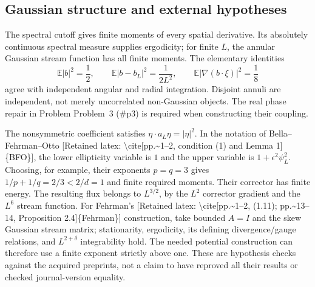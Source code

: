 \documentclass[10pt]{article}
\begin{document}
\subsection*{Gaussian structure and external hypotheses}
The spectral cutoff gives finite moments of every spatial derivative. Its absolutely continuous spectral measure supplies ergodicity; for finite \(L\), the annular Gaussian stream function has all finite moments. The elementary identities \[\mathbb E|b|^2=\frac12,\qquad
 \mathbb E|b-b_L|^2=\frac1{2L^2},\qquad
 \mathbb E|\nabla(b\cdot\xi)|^2=\frac18\] agree with independent angular and radial integration. Disjoint annuli are independent, not merely uncorrelated non-Gaussian objects. The real phase repair in Problem Problem 3 (\#p3) is required when constructing their coupling.\par
The nonsymmetric coefficient satisfies \(\eta\cdot a_L\eta=|\eta|^2\). In the notation of Bella–Fehrman–Otto [Retained latex: \textbackslash{}cite[pp.\textasciitilde{}1--2, condition (1) and Lemma 1]\{BFO\}], the lower ellipticity variable is \(1\) and the upper variable is \(1+\epsilon^2\psi_L^2\). Choosing, for example, their exponents \(p=q=3\) gives \(1/p+1/q=2/3<2/d=1\) and finite required moments. Their corrector has finite energy. The resulting flux belongs to \(L^{3/2}\), by the \(L^2\) corrector gradient and the \(L^6\) stream function. For Fehrman’s [Retained latex: \textbackslash{}cite[pp.\textasciitilde{}1--2, (1.11); pp.\textasciitilde{}13--14,
Proposition 2.4]\{Fehrman\}] construction, take bounded \(A=I\) and the skew Gaussian stream matrix; stationarity, ergodicity, its defining divergence/gauge relations, and \(L^{2+\delta}\) integrability hold. The needed potential construction can therefore use a finite exponent strictly above one. These are hypothesis checks against the acquired preprints, not a claim to have reproved all their results or checked journal-version equality.\par
\end{document}
